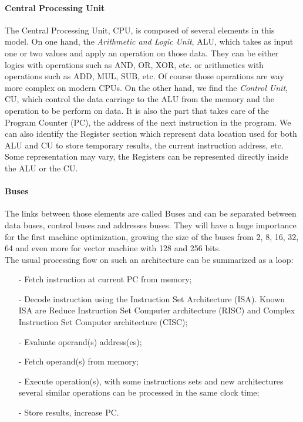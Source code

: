 \paragraph{Central Processing Unit}
The Central Processing Unit, CPU, is composed of several elements in this model. 
On one hand, the \textit{Arithmetic and Logic Unit}, ALU, which takes as input one or two values and apply an operation on those data. 
They can be either logics with operations such as AND, OR, XOR, etc. or arithmetics with operations such as ADD, MUL, SUB, etc. 
Of course those operations are way more complex on modern CPUs. 
On the other hand, we find the \textit{Control Unit}, CU, which control the data carriage to the ALU from the memory and the operation to be perform on data.
It is also the part that takes care of the Program Counter (PC), the address of the next instruction in the program. 
We can also identify the Register section which represent data location used for both ALU and CU to store temporary results, the current instruction address, etc. 
Some representation may vary, the Registers can be represented directly inside the ALU or the CU. 
\paragraph{Buses}
The links between those elements are called Buses and can be separated between data buses, control buses and addresses buses.
They will have a huge importance for the first machine optimization, growing the size of the buses from 2, 8, 16, 32, 64 and even more for vector machine with 128 and 256 bits.\\

The usual processing flow on such an architecture can be summarized as a loop: 
\begin{itemize}[noitemsep,nolistsep]
\item[-] Fetch instruction at current PC from memory;
\item[-] Decode instruction using the Instruction Set Architecture (ISA). Known ISA are Reduce Instruction Set Computer architecture (RISC) and Complex Instruction Set Computer architecture (CISC);
\item[-] Evaluate operand(s) address(es);
\item[-] Fetch operand(s) from memory;
\item[-] Execute operation(s), with some instructions sets and new architectures several similar operations can be processed in the same clock time;
\item[-] Store results, increase PC.\\
\end{itemize}


